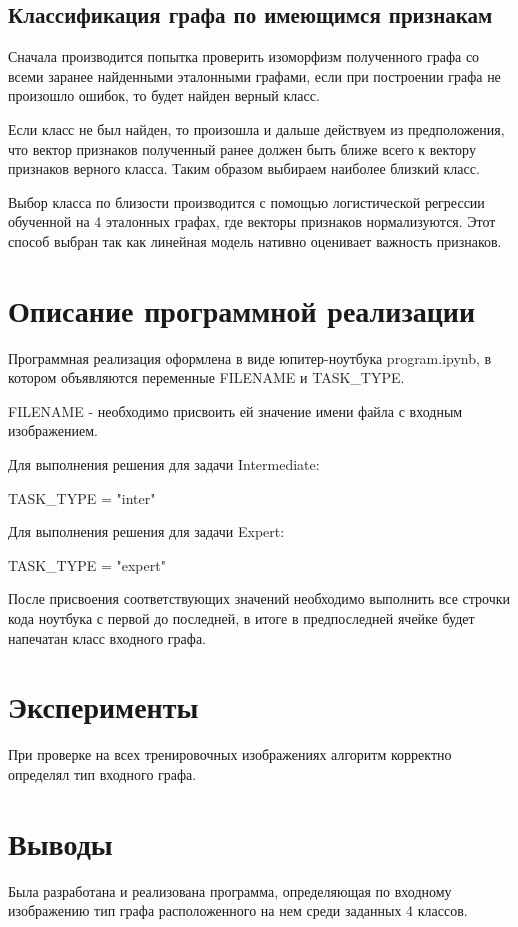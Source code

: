 \documentclass[10pt]{article}
\begin{document}
	
	
	\subsection*{Классификация графа по имеющимся признакам}
	
	Сначала производится попытка проверить изоморфизм полученного графа со всеми заранее найденными эталонными графами, если при построении графа не произошло ошибок, то будет найден верный класс.
	
	Если класс не был найден, то произошла и дальше действуем из предположения, что вектор признаков полученный ранее должен быть ближе всего к вектору признаков верного класса. Таким образом выбираем наиболее близкий класс. 
	
	Выбор класса по близости производится с помощью логистической регрессии обученной на 4 эталонных графах, где векторы признаков нормализуются. Этот способ выбран так как линейная модель нативно оценивает важность признаков.
	
	
	\section*{Описание программной реализации}
	
	Программная реализация оформлена в виде юпитер-ноутбука program.ipynb,
	в котором объявляются переменные FILENAME и TASK\_TYPE.
	
	FILENAME - необходимо присвоить ей значение имени файла с входным изображением.
	
    
    Для выполнения решения для задачи Intermediate:
    
	TASK\_TYPE = "inter"
	
	Для выполнения решения для задачи Expert:
	
	TASK\_TYPE = "expert"
	
	
	После присвоения соответствующих значений необходимо выполнить все строчки кода ноутбука с первой до последней, в итоге в предпоследней ячейке будет напечатан класс входного графа.
	
	
	\section*{Эксперименты}
	
	При проверке на всех тренировочных изображениях алгоритм корректно определял тип входного графа.
	
	\section*{Выводы}
	
	Была разработана и реализована программа, определяющая по входному изображению тип графа расположенного на нем среди заданных 4 классов. 
	
	
\end{document}
